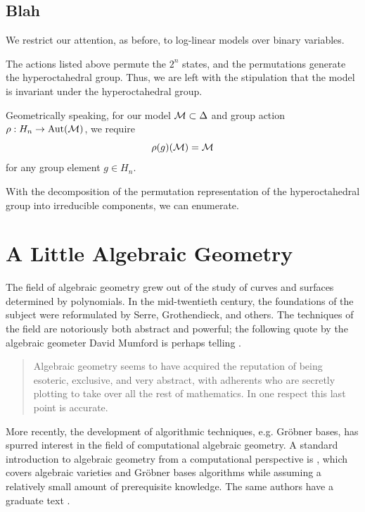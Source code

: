 \documentclass[cclicense]{hmcthesis}
\numberwithin{equation}{chapter}
\numberwithin{thmcounter}{chapter}
\begin{document}
\section{Blah}

    We restrict our attention, as before, to log-linear models over binary
    variables.

    The actions listed above permute the $2^n$ states, and the permutations
    generate the hyperoctahedral group.  Thus, we are left with the stipulation
    that the model is invariant under the hyperoctahedral group.

    Geometrically speaking, for our model $\mathcal{M} \subset \Delta$ and group
    action $\rho: H_n \to \mathrm{Aut}(\mathcal{M})$, we require
    \[
        \rho(g)(\mathcal{M}) = \mathcal{M}
    \]
    for any group element $g \in H_n$.

    With the decomposition of the permutation representation of the
    hyperoctahedral group into irreducible components, we can enumerate.



\appendix


\chapter{A Little Algebraic Geometry}

    The field of algebraic geometry grew out of the study of curves and surfaces
    determined by polynomials.  In the mid-twentieth century, the foundations of
    the subject were reformulated by Serre, Grothendieck, and others.  The
    techniques of the field are notoriously both abstract and powerful; the
    following quote by the algebraic geometer David Mumford is perhaps telling
    \citep{Mum99}.
    \begin{quote}
        Algebraic geometry seems to have acquired the reputation of being
        esoteric, exclusive, and very abstract, with adherents who are secretly
        plotting to take over all the rest of mathematics.  In one respect this
        last point is accurate.
    \end{quote}
    More recently, the development of algorithmic techniques, e.g. Gröbner
    bases, has spurred interest in the field of computational algebraic
    geometry.  A standard introduction to algebraic geometry from a
    computational perspective is \citep{CLO97}, which covers algebraic varieties
    and Gröbner bases algorithms while assuming a relatively small amount of
    prerequisite knowledge.  The same authors have a graduate text \citep{CLO05}.
\end{document}
